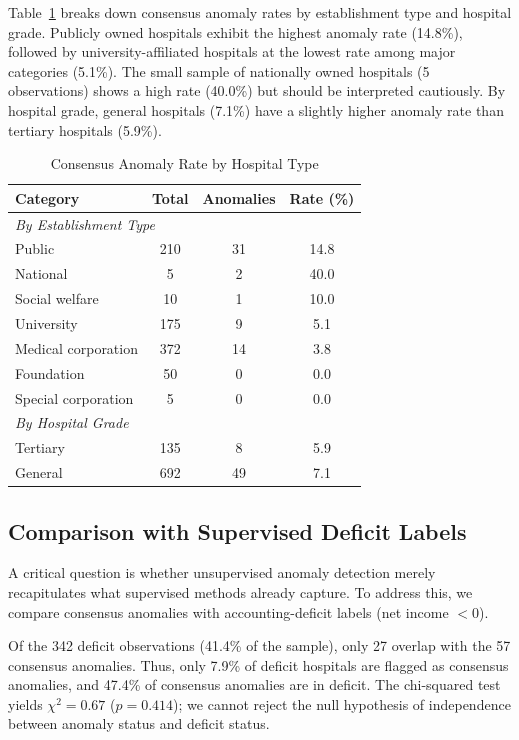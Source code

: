 \documentclass{ieeeaccess}
\begin{document}
Table~\ref{tab:types} breaks down consensus anomaly rates by establishment type and hospital grade. Publicly owned hospitals exhibit the highest anomaly rate (14.8\%), followed by university-affiliated hospitals at the lowest rate among major categories (5.1\%). The small sample of nationally owned hospitals (5 observations) shows a high rate (40.0\%) but should be interpreted cautiously. By hospital grade, general hospitals (7.1\%) have a slightly higher anomaly rate than tertiary hospitals (5.9\%).

\begin{table}[!t]
\centering
\caption{Consensus Anomaly Rate by Hospital Type}
\label{tab:types}
\begin{tabular}{@{}lccc@{}}
\toprule
\textbf{Category} & \textbf{Total} & \textbf{Anomalies} & \textbf{Rate (\%)} \\
\midrule
\multicolumn{4}{l}{\textit{By Establishment Type}} \\
\quad Public & 210 & 31 & 14.8 \\
\quad National & 5 & 2 & 40.0 \\
\quad Social welfare & 10 & 1 & 10.0 \\
\quad University & 175 & 9 & 5.1 \\
\quad Medical corporation & 372 & 14 & 3.8 \\
\quad Foundation & 50 & 0 & 0.0 \\
\quad Special corporation & 5 & 0 & 0.0 \\
\midrule
\multicolumn{4}{l}{\textit{By Hospital Grade}} \\
\quad Tertiary & 135 & 8 & 5.9 \\
\quad General & 692 & 49 & 7.1 \\
\bottomrule
\end{tabular}
\end{table}

\subsection{Comparison with Supervised Deficit Labels}
\label{subsec:overlap}

A critical question is whether unsupervised anomaly detection merely recapitulates what supervised methods already capture. To address this, we compare consensus anomalies with accounting-deficit labels (net income $< 0$).

Of the 342 deficit observations (41.4\% of the sample), only 27 overlap with the 57 consensus anomalies. Thus, only 7.9\% of deficit hospitals are flagged as consensus anomalies, and 47.4\% of consensus anomalies are in deficit. The chi-squared test yields $\chi^2 = 0.67$ ($p = 0.414$); we cannot reject the null hypothesis of independence between anomaly status and deficit status.
\end{document}
